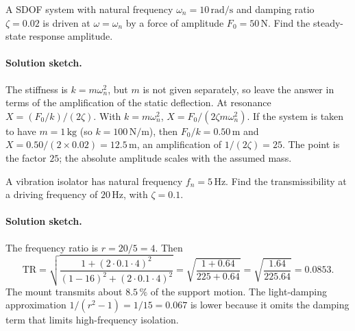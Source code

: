 \begin{exercise}
A SDOF system with natural frequency $\omega_n = 10\,\si{\radian\per
\second}$ and damping ratio $\zeta = 0.02$ is driven at $\omega =
\omega_n$ by a force of amplitude $F_0 = 50\,\text{N}$. Find the
steady-state response amplitude.

\paragraph{Solution sketch.} The stiffness is $k = m\omega_n^2$, but
$m$ is not given separately, so leave the answer in terms of the
amplification of the static deflection. At resonance $X =
(F_0/k)/(2\zeta)$. With $k = m\omega_n^2$, $X = F_0/(2\zeta m
\omega_n^2)$. If the system is taken to have $m = 1\,\si{\kilogram}$
(so $k = 100\,\si{\newton\per\meter}$), then $F_0/k = 0.50\,\si{
\meter}$ and $X = 0.50/(2 \times 0.02) = 12.5\,\si{\meter}$, an
amplification of $1/(2\zeta) = 25$. The point is the factor $25$; the
absolute amplitude scales with the assumed mass.
\end{exercise}

\begin{exercise}
A vibration isolator has natural frequency $f_n = 5\,\si{\hertz}$.
Find the transmissibility at a driving frequency of $20\,\si{
\hertz}$, with $\zeta = 0.1$.

\paragraph{Solution sketch.} The frequency ratio is $r = 20/5 = 4$.
Then
\[
\mathrm{TR} = \sqrt{\frac{1 + (2\cdot 0.1\cdot 4)^2}{(1 - 16)^2 +
(2\cdot 0.1\cdot 4)^2}} = \sqrt{\frac{1 + 0.64}{225 + 0.64}} =
\sqrt{\frac{1.64}{225.64}} = 0.0853.
\]
The mount transmits about $8.5\,\%$ of the support motion. The
light-damping approximation $1/(r^2 - 1) = 1/15 = 0.067$ is lower
because it omits the damping term that limits high-frequency
isolation.
\end{exercise}

